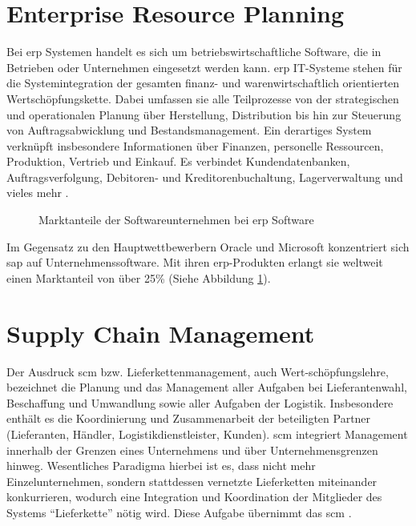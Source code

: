 \section{Enterprise Resource Planning}
\label{sec:erp-definition}
Bei \gls{erp} Systemen handelt es sich um betriebswirtschaftliche Software, die in Betrieben oder Unternehmen eingesetzt werden kann. \gls{erp} IT-Systeme stehen für die Systemintegration der gesamten finanz- und warenwirtschaftlich orientierten Wertschöpfungskette. Dabei umfassen sie alle Teilprozesse von der strategischen und operationalen Planung über Herstellung, Distribution bis hin zur Steuerung von Auftragsabwicklung und Bestandsmanagement. Ein derartiges System verknüpft insbesondere Informationen über Finanzen, personelle Ressourcen, Produktion, Vertrieb und Einkauf. Es verbindet Kundendatenbanken, Auftragsverfolgung, Debitoren- und Kreditorenbuchaltung, Lagerverwaltung und vieles mehr \cite{ERPDefinition}.

\begin{figure}[H]
  \centering 
  \caption{Marktanteile der Softwareunternehmen bei \gls{erp} Software} 
  \label{abb:SAPMarktanteil} 
\end{figure} 

Im Gegensatz zu den Hauptwettbewerbern Oracle und Microsoft konzentriert sich \gls{sap} auf Unternehmenssoftware. Mit ihren \gls{erp}-Produkten erlangt sie weltweit einen Marktanteil von über 25\% (Siehe Abbildung \ref{abb:SAPMarktanteil}).

\section{Supply Chain Management}
\label{sec:scm-definition}
Der Ausdruck \gls{scm} bzw. Lieferkettenmanagement, auch Wert-schöpfungslehre, bezeichnet die Planung und das Management aller Aufgaben bei Lieferantenwahl, Beschaffung und Umwandlung sowie aller Aufgaben der Logistik. Insbesondere enthält es die Koordinierung und Zusammenarbeit der beteiligten Partner (Lieferanten, Händler, Logistikdienstleister, Kunden). \gls{scm} integriert Management innerhalb der Grenzen eines Unternehmens und über Unternehmensgrenzen hinweg. Wesentliches Paradigma hierbei ist es, dass nicht mehr Einzelunternehmen, sondern stattdessen vernetzte Lieferketten miteinander konkurrieren, wodurch eine Integration und Koordination der Mitglieder des Systems "`Lieferkette"' nötig wird. Diese Aufgabe übernimmt das \gls{scm} \cite{SCMDefinition}.

